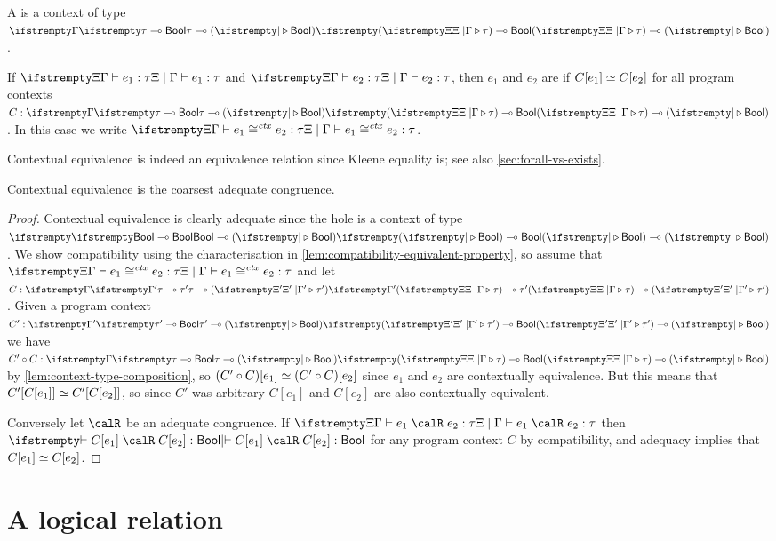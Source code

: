 A  is a context of type $\ctxtype{\Xi}{\Gamma}{\tau}{}{}{\typeBool}$.

\begin{definition}
    If $\typerel{\Xi}{\Gamma}{e_1}{\tau}$ and $\typerel{\Xi}{\Gamma}{e_2}{\tau}$, then $e_1$ and $e_2$ are  if $C[e_1] \simeq C[e_2]$ for all program contexts $\ctxhastype{C}{\Xi}{\Gamma}{\tau}{}{}{\typeBool}$. In this case we write $\ctxequiv{\Xi}{\Gamma}{e_1}{e_2}{\tau}$.
\end{definition}
%
Contextual equivalence is indeed an equivalence relation since Kleene equality is; see also \cref{sec:forall-vs-exists}.




\begin{theorem}
    \label{thm:contextual-equivalence-coarsest}
    Contextual equivalence is the coarsest adequate congruence.
\end{theorem}

\begin{proof}
    Contextual equivalence is clearly adequate since the hole is a context of type $\ctxtype{}{}{\typeBool}{}{}{\typeBool}$. We show compatibility using the characterisation in \cref{lem:compatibility-equivalent-property}, so assume that $\ctxequiv{\Xi}{\Gamma}{e_1}{e_2}{\tau}$ and let $\ctxhastype{C}{\Xi}{\Gamma}{\tau}{\Xi'}{\Gamma'}{\tau'}$. Given a program context $\ctxhastype{C'}{\Xi'}{\Gamma'}{\tau'}{}{}{\typeBool}$ we have $\ctxhastype{C' \circ C}{\Xi}{\Gamma}{\tau}{}{}{\typeBool}$ by \cref{lem:context-type-composition}, so $(C' \circ C)[e_1] \simeq (C' \circ C)[e_2]$ since $e_1$ and $e_2$ are contextually equivalence. But this means that $C'[C[e_1]] \simeq C'[C[e_2]]$, so since $C'$ was arbitrary $C[e_1]$ and $C[e_2]$ are also contextually equivalent.

    Conversely let $\calR$ be an adequate congruence. If $\typeindrel{\Xi}{\Gamma}{e_1}{\calR}{e_2}{\tau}$ then $\typeindrel{}{}{C[e_1]}{\calR}{C[e_2]}{\typeBool}$ for any program context $C$ by compatibility, and adequacy implies that $C[e_1] \simeq C[e_2]$.
\end{proof}

\section{A logical relation}

